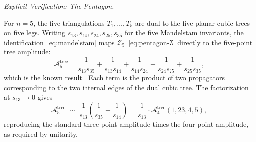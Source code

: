 \documentclass[11pt]{article}
\theoremstyle{plain}
\theoremstyle{definition}
\theoremstyle{remark}
\begin{document}
\medskip\noindent\textit{Explicit Verification: The Pentagon.}

For $n = 5$, the five triangulations $T_1, \ldots, T_5$ are dual to the
five planar cubic trees on five legs. Writing $s_{13}, s_{14}, s_{24},
s_{25}, s_{35}$ for the five Mandelstam invariants, the
identification~\eqref{eq:mandelstam} maps
$\mathcal{Z}_5$~\eqref{eq:pentagon-Z} directly to the five-point tree
amplitude:
\[
  \mathcal{A}_5^{\mathrm{tree}} = \frac{1}{s_{13}s_{35}}
  + \frac{1}{s_{13}s_{14}} + \frac{1}{s_{14}s_{24}}
  + \frac{1}{s_{24}s_{25}} + \frac{1}{s_{25}s_{35}},
\]
which is the known result \cite{ArkaniHamedTalk, ABHY2018}.
Each term is the product of two propagators corresponding to the two
internal edges of the dual cubic tree.
The factorization at $s_{13} \to 0$ gives
\[
  \mathcal{A}_5^{\mathrm{tree}} \;\sim\; \frac{1}{s_{13}}
  \!\left(\frac{1}{s_{35}} + \frac{1}{s_{14}}\right)
  = \frac{1}{s_{13}} \cdot \mathcal{A}_4^{\mathrm{tree}}(1,23,4,5),
\]
reproducing the standard three-point amplitude times the four-point
amplitude, as required by unitarity.
\end{document}
